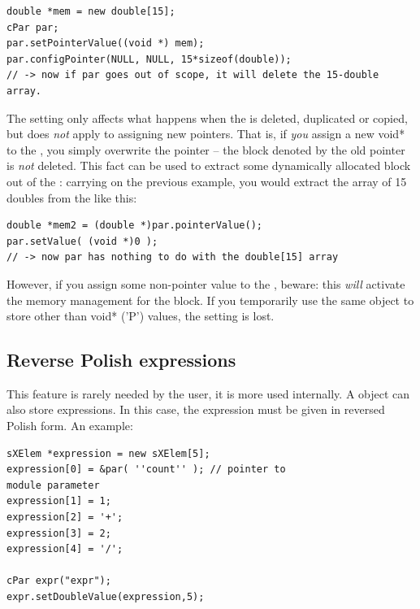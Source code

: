 \begin{Verbatim}
double *mem = new double[15];
cPar par;
par.setPointerValue((void *) mem);
par.configPointer(NULL, NULL, 15*sizeof(double));
// -> now if par goes out of scope, it will delete the 15-double array.
\end{Verbatim}

The  setting only affects what happens when the
 is deleted, duplicated or copied, but does \textit{not}
apply to assigning new pointers. That is, if \textit{you} assign a new
void* to the , you simply overwrite the pointer -- the
block denoted by the old pointer is \textit{not} deleted. This fact
can be used to extract some dynamically allocated block out of the
: carrying on the previous example, you would extract the
array of 15 doubles from the  like this:

\begin{Verbatim}
double *mem2 = (double *)par.pointerValue();
par.setValue( (void *)0 );
// -> now par has nothing to do with the double[15] array 
\end{Verbatim}



However, if you assign some non-pointer value
to the , beware: this \textit{will} activate the memory
management for the block. If you temporarily use the same
 object to store other than void* ('P') values, the
 setting is lost.



\subsection{Reverse Polish expressions}

This feature is rarely needed by the user, it is more used internally.
A  object can also store
expressions. In this case, the expression must
be given in reversed Polish form. An
example:

\begin{Verbatim}
sXElem *expression = new sXElem[5];
expression[0] = &par( ''count'' ); // pointer to 
module parameter
expression[1] = 1;
expression[2] = '+';
expression[3] = 2;
expression[4] = '/';

cPar expr("expr");
expr.setDoubleValue(expression,5);
\end{Verbatim}


